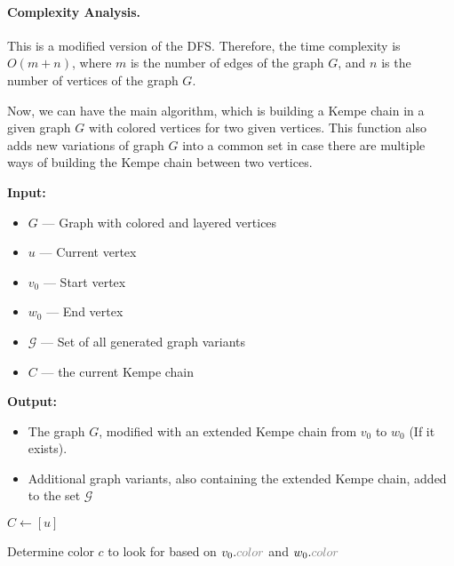 \paragraph{Complexity Analysis.}

This is a modified version of the DFS. Therefore, the time complexity is $O(m + n)$, where $m$ is the number of edges of the graph $G$, and 
$n$ is the number of vertices of the graph $G$.

Now, we can have the main algorithm, which is building a Kempe chain in a given graph $G$ with colored vertices for two given vertices. This function also 
adds new variations of graph $G$ into a common set in case there are multiple ways of building the Kempe chain between two vertices.

\begin{algorithm}[H]
    \caption{$(G, u, v_0, w_0, \mathcal{G}, C)$}
    \begin{algorithmic}[1]
        \Statex \textbf{Input:} 
        \begin{itemize}
            \item \( G \) — Graph with colored and layered vertices
            \item \( u \) — Current vertex
            \item \( v_0 \) — Start vertex
            \item \( w_0 \) — End vertex
            \item \( \mathcal{G} \) — Set of all generated graph variants
            \item \( C \) — the current Kempe chain
        \end{itemize}
        
        \Statex \textbf{Output:} 
        \begin{itemize}
            \item The graph \( G \), modified with an extended Kempe chain from \( v_0 \) to \( w_0 \) (If it exists).
            \item Additional graph variants, also containing the extended Kempe chain, added to the set \( \mathcal{G} \)
        \end{itemize}
    
        \State $C \gets [u]$
    \EndIf
        \State \Return {}
    \EndIf
    
    \State Determine color $c$ to look for based on $v_0.\textcolor{gray}{color}$ and $w_0.\textcolor{gray}{color}$
    

\end{algorithmic}
\end{algorithm}
